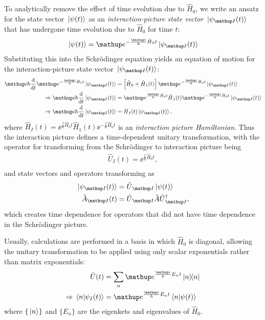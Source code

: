 To analytically remove the effect of time evolution due to $\hat H_0$, we write an ansatz for the state vector $\ket{\psi(t)}$ as an \emph{interaction-picture state vector} $\ket{\psi_\up{I}(t)}$ that has undergone time evolution due to $\hat H_0$ for time $t$:
\begin{align}
\ket{\psi(t)} = \ee^{-\frac\ii\hbar\hat H_0 t}\ket{\psi_\up{I}(t)}
\end{align}
Substituting this into the Schr\"odinger equation yields an equation of motion for the interaction-picture state vector $\ket{\psi_\up{I}(t)}$:
\begin{align}
\ii\hbar\dv t \ee^{-\frac\ii\hbar\hat H_0 t}\ket{\psi_\up{I}(t)} &= 
\left[\hat H_0 + \hat H_1(t)\right]\ee^{-\frac\ii\hbar\hat H_0 t}\ket{\psi_\up{I}(t)}\\
\Rightarrow \ii\hbar\dv t\ket{\psi_\up{I}(t)} &=
\ee^{\frac\ii\hbar\hat H_0 t}\hat H_1(t)\ee^{-\frac\ii\hbar\hat H_0 t}\ket{\psi_\up{I}(t)}\\
\Rightarrow \ii\hbar\dv t\ket{\psi_\up{I}(t)} &= \hat H_I(t)\ket{\psi_\up{I}(t)},
\end{align}
where $\hat H_I(t)=\ee^{\frac\ii\hbar\hat H_0 t}\hat H_1(t)\ee^{-\frac\ii\hbar\hat H_0 t}$ is an \emph{interaction picture Hamiltonian}. Thus the interaction picture defines a time-dependent unitary transformation, with the operator for transforming from the Schr\"odinger to interaction picture being
\begin{align}
\hat U_I(t) = \ee^{\frac\ii\hbar\hat H_0 t},\\
\end{align}
and state vectors and operators transforming as
\begin{align}
\ket{\psi_\up{I}(t)} &= \hat U_\up{I}\ket{\psi(t)}\\
\hat A_\up{I}(t) &= \hat U_\up{I} \hat A \hat U^\dagger_\up{I},
\end{align} 
which creates time dependence for operators that did not have time dependence in the Schr\"odinger picture.

Usually, calculations are performed in a basis in which $\hat H_0$ is diagonal, allowing the unitary transformation to be applied using only scalar exponentials rather than matrix exponentials:
\begin{align}
\hat U(t) &= \sum_n \ee^{\frac\ii\hbar E_n t}\ketbra{n}{n}\\
\Rightarrow \braket{n}{\psi_I(t)} &= \ee^{\frac\ii\hbar E_n t}\braket{n}{\psi(t)}\label{eq:interaction_picture_psi_transform_diagonal}
\end{align}
where $\{\ket{n}\}$ and $\{E_n\}$ are the eigenkets and eigenvalues of $\hat H_0$.

